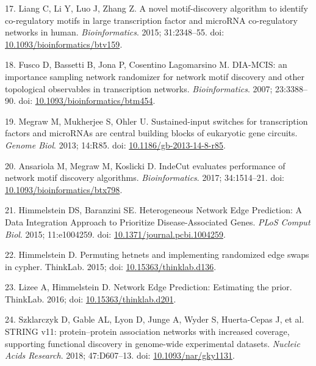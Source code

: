 \begin{CSLReferences}{0}{0}
\leavevmode{}%
17. Liang C, Li Y, Luo J, Zhang Z. A novel motif-discovery algorithm to identify co-regulatory motifs in large transcription factor and microRNA co-regulatory networks in human. \emph{Bioinformatics}. 2015; 31:2348--55. doi: \href{https://doi.org/10.1093/bioinformatics/btv159}{10.1093/bioinformatics/btv159}.

\leavevmode{}%
18. Fusco D, Bassetti B, Jona P, Cosentino Lagomarsino M. DIA-MCIS: an importance sampling network randomizer for network motif discovery and other topological observables in transcription networks. \emph{Bioinformatics}. 2007; 23:3388--90. doi: \href{https://doi.org/10.1093/bioinformatics/btm454}{10.1093/bioinformatics/btm454}.

\leavevmode{}%
19. Megraw M, Mukherjee S, Ohler U. Sustained-input switches for transcription factors and microRNAs are central building blocks of eukaryotic gene circuits. \emph{Genome Biol}. 2013; 14:R85. doi: \href{https://doi.org/10.1186/gb-2013-14-8-r85}{10.1186/gb-2013-14-8-r85}.

\leavevmode{}%
20. Ansariola M, Megraw M, Koslicki D. IndeCut evaluates performance of network motif discovery algorithms. \emph{Bioinformatics}. 2017; 34:1514--21. doi: \href{https://doi.org/10.1093/bioinformatics/btx798}{10.1093/bioinformatics/btx798}.

\leavevmode{}%
21. Himmelstein DS, Baranzini SE. Heterogeneous Network Edge Prediction: A Data Integration Approach to Prioritize Disease-Associated Genes. \emph{PLoS Comput Biol}. 2015; 11:e1004259. doi: \href{https://doi.org/10.1371/journal.pcbi.1004259}{10.1371/journal.pcbi.1004259}.

\leavevmode{}%
22. Himmelstein D. Permuting hetnets and implementing randomized edge swaps in cypher. ThinkLab. 2015; doi: \href{https://doi.org/10.15363/thinklab.d136}{10.15363/thinklab.d136}.

\leavevmode{}%
23. Lizee A, Himmelstein D. Network Edge Prediction: Estimating the prior. ThinkLab. 2016; doi: \href{https://doi.org/10.15363/thinklab.d201}{10.15363/thinklab.d201}.

\leavevmode{}%
24. Szklarczyk D, Gable AL, Lyon D, Junge A, Wyder S, Huerta-Cepas J, et al. STRING v11: protein--protein association networks with increased coverage, supporting functional discovery in genome-wide experimental datasets. \emph{Nucleic Acids Research}. 2018; 47:D607--13. doi: \href{https://doi.org/10.1093/nar/gky1131}{10.1093/nar/gky1131}.


\end{CSLReferences}

